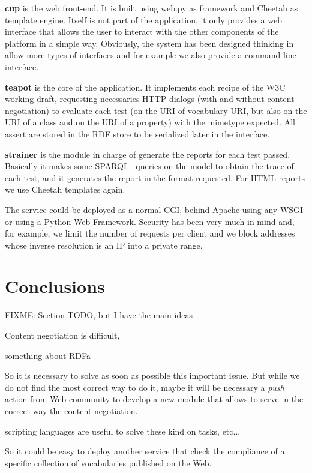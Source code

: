 \begin{description}

  \item \textbf{cup} is the web front-end. It is built using web.py as framework
        and Cheetah as template engine. Itself is not part of the application,
        it only provides a web interface that allows the user to interact with
        the other components of the platform in a simple way. Obviously, the
        system has been designed thinking in allow more types of interfaces
        and for example we also provide a command line interface.

  \item \textbf{teapot} is the core of the application. It implements each
        recipe of the W3C working draft, requesting necessaries HTTP dialogs 
        (with and without content negotiation) to evaluate each test (on the 
        URI of vocabulary URI, but also on the URI of a class and on the URI 
        of a property) with the mimetype expected. All assert are stored in
        the RDF store to be serialized later in the interface.

  \item \textbf{strainer} is the module in charge of generate the reports for
        each test passed. Basically it makes some SPARQL~\cite{SPARQL} queries
        on the model to obtain the trace of each test, and it generates the
        report in the format requested. For HTML reports we use Cheetah templates
        again.

\end{description}

The service could be deployed as a normal CGI, behind Apache using any WSGI or
using a Python Web Framework. Security has been very much in mind and, for example, 
we limit the number of requests per client and we block addresses whose inverse 
resolution is an IP into a private range.

\section{\label{sec:conclusions}Conclusions}

FIXME: Section TODO, but I have the main ideas

Content negotiation is difficult,

something about RDFa~\cite{Birbeck2006}

So it is necessary to solve as soon as possible this important issue. %
But while we do not find the most correct way to do it, maybe it will be 
necessary a \textit{push} action from Web community to develop a new
module that allows to serve in the correct way the content negotiation.

scripting languages are useful to solve these kind on tasks, etc... 

So it could be easy 
to deploy another service that check the compliance of a specific collection 
of vocabularies published on the Web.
